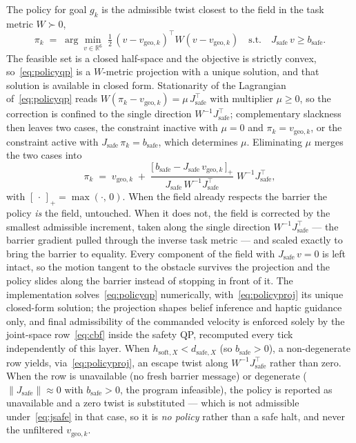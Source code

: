 The policy for goal $g_k$ is the admissible twist closest to the field in the task metric $W \succ 0$,
\begin{equation}
\pi_k \;=\; \arg\min_{v \in \mathbb{R}^6}\; \tfrac{1}{2}\,(v - v_{\text{geo},k})^{\top} W (v - v_{\text{geo},k})
\quad \text{s.t.} \quad J_{\text{safe}}\, v \ge b_{\text{safe}}.
\label{eq:policyqp}
\end{equation}
The feasible set is a closed half-space and the objective is strictly convex, so~\eqref{eq:policyqp} is a $W$-metric projection with a unique solution, and that solution is available in closed form. Stationarity of the Lagrangian of~\eqref{eq:policyqp} reads $W(\pi_k - v_{\text{geo},k}) = \mu\,J_{\text{safe}}^{\top}$ with multiplier $\mu \ge 0$, so the correction is confined to the single direction $W^{-1}J_{\text{safe}}^{\top}$; complementary slackness then leaves two cases, the constraint inactive with $\mu = 0$ and $\pi_k = v_{\text{geo},k}$, or the constraint active with $J_{\text{safe}}\,\pi_k = b_{\text{safe}}$, which determines $\mu$. Eliminating $\mu$ merges the two cases into
\begin{equation}
\pi_k \;=\; v_{\text{geo},k} \;+\; \frac{\bigl[\,b_{\text{safe}} - J_{\text{safe}}\,v_{\text{geo},k}\,\bigr]_{+}}{J_{\text{safe}}\,W^{-1}J_{\text{safe}}^{\top}}\;W^{-1}J_{\text{safe}}^{\top},
\label{eq:policyproj}
\end{equation}
with $[\,\cdot\,]_{+} = \max(\cdot,\,0)$. When the field already respects the barrier the policy \emph{is} the field, untouched. When it does not, the field is corrected by the smallest admissible increment, taken along the single direction $W^{-1}J_{\text{safe}}^{\top}$ --- the barrier gradient pulled through the inverse task metric --- and scaled exactly to bring the barrier to equality. Every component of the field with $J_{\text{safe}}\,v = 0$ is left intact, so the motion tangent to the obstacle survives the projection and the policy slides along the barrier instead of stopping in front of it. The implementation solves~\eqref{eq:policyqp} numerically, with~\eqref{eq:policyproj} its unique closed-form solution; the projection shapes belief inference and haptic guidance only, and final admissibility of the commanded velocity is enforced solely by the joint-space row~\eqref{eq:cbf} inside the safety QP, recomputed every tick independently of this layer. When $h_{\text{soft},X} < d_{\text{safe},X}$ (so $b_{\text{safe}} > 0$), a non-degenerate row yields, via~\eqref{eq:policyproj}, an escape twist along $W^{-1}J_{\text{safe}}^{\top}$ rather than zero. When the row is unavailable (no fresh barrier message) or degenerate ($\lVert J_{\text{safe}} \rVert \approx 0$ with $b_{\text{safe}} > 0$, the program infeasible), the policy is reported as unavailable and a zero twist is substituted --- which is not admissible under~\eqref{eq:jsafe} in that case, so it is \emph{no policy} rather than a safe halt, and never the unfiltered $v_{\text{geo},k}$.

